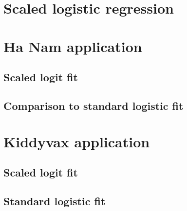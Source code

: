 \documentclass[12pt]{article}
\begin{document}


\section{Scaled logistic regression}



\section{Ha Nam application}



\subsection{Scaled logit fit}



\subsection{Comparison to standard logistic fit}



\section{Kiddyvax application}



\subsection{Scaled logit fit}



\subsection{Standard logistic fit}
\end{document}
